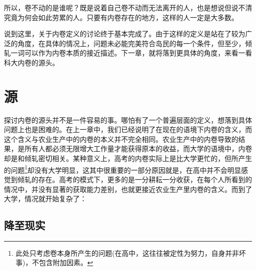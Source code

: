 \documentclass[UTF8,a4paper,fontset=windows,11pt,openany]{ctexbook}
\begin{document}
所以，卷不动的是谁呢？既是说着自己卷不动而无法离开的人，也是想说但说不清究竟为何会如此劳累的人。只要有内卷存在的地方，这样的人一定是大多数。

说到这里，关于内卷定义的讨论终于基本完成了。由于这样的定义是站在了较为广泛的角度，在具体的情况上，问题未必能完美符合岛民的每一个条件，但至少，倾轧一词可以作为内卷本质的接近描述。下一章，就将落到更具体的角度，来看一看科大内卷的源头。

\chapter{源}

探讨内卷的源头并不是一件容易的事。哪怕有了一个普遍层面的定义，想落到具体问题上也是困难的。在上一章中，我们已经说明了在现在的语境下内卷的含义，而这个含义与农业生产中的内卷的本义并不完全相同。农业生产中的内卷导致的结果，是所有人都必须无限增大工作量才能获得原本的收益，而大学的语境中，内卷却是和倾轧密切相关。某种意义上，高考的内卷实际上是比大学更忙的，但所产生的问题\footnote{此处只考虑卷本身所产生的问题(在高中，这往往被定性为努力，自身并非坏事)，不包含附加因素。}却没有大学明显，这其中很重要的一部分原因就是，在高中并不会明显感觉到倾轧的存在。高考的模式下，更多的是一分耕耘一分收获，在每个人所看到的情况中，并没有显著的获取能力差别，也就更接近农业生产里内卷的含义。而到了大学，情况就开始复杂了：

\section{降至现实}
\end{document}
